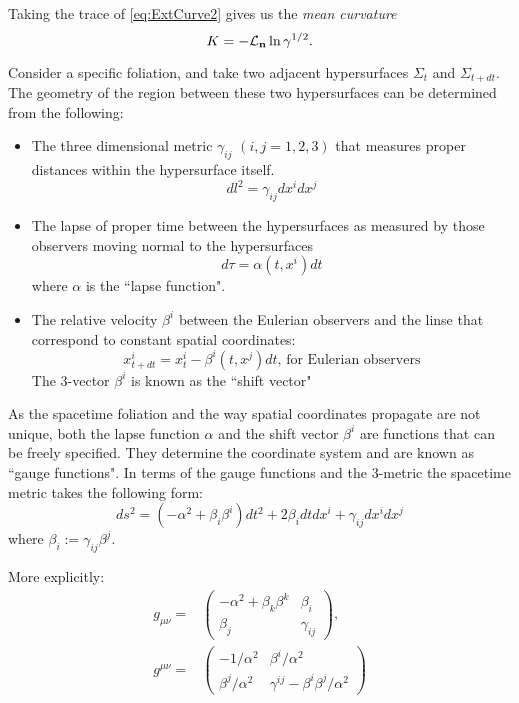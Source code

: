 Taking the trace of \ref{eq:ExtCurve2} gives us the \textit{mean curvature}
\begin{equation}
K= - {\mathcal{L}}_{\mathbf{n}} \ln \gamma^{1/2}.
\end{equation}



Consider a specific foliation, and take two adjacent hypersurfaces $\Sigma_t$ and $\Sigma_{t+dt}$. The geometry of the region between these two hypersurfaces can be determined from the following:
\begin{itemize} 
\item The three dimensional metric $\gamma_{ij}$ $(i,j = 1,2,3)$ that measures proper distances within the hypersurface itself.
\[ dl^2= \gamma_{ij} dx^i dx^j \]
\item The lapse of proper time between the hypersurfaces as measured by those observers moving normal to the hypersurfaces
\[ d\tau = \alpha(t,x^i) dt \]
where $\alpha$ is the ``lapse function".
\item The relative velocity $\beta^i$ between the Eulerian observers and the linse that correspond to constant spatial coordinates:
\[ x^i_{t+dt} = x^i_t - \beta^i(t,x^j)dt \mbox{, for Eulerian observers} \]
The 3-vector $\beta^i$ is known as the ``shift vector"
\end{itemize}
As the spacetime foliation and the way spatial coordinates propagate are not unique, both the lapse function $\alpha$ and the shift vector $\beta^i$ are functions that can be freely specified. They determine the coordinate system and are known as ``gauge functions". In terms of the gauge functions and the 3-metric the spacetime metric takes the following form:
\[ ds^2=(-\alpha^2 + \beta_i \beta^i)dt^2 + 2 \beta_i dt dx^i + \gamma_{ij} dx^i dx^j \]
where $\beta_i := \gamma_{ij} \beta^j$.

More explicitly:
\begin{eqnarray}
g_{\mu \nu} = & \left( \begin{array}{ccc}
						-\alpha^2 + \beta_k \beta^k & \beta_i \\
							\beta_j					& \gamma_{ij}
						\end{array} \right), \\
g^{\mu \nu} = & \left( \begin{array}{ccc}
						-1/\alpha^2 		& 	\beta^i / \alpha^2 \\
						\beta^j / \alpha^2 	&	\gamma^{ij}-\beta^i\beta^j / \alpha^2 
						\end{array} \right)
\end{eqnarray}

